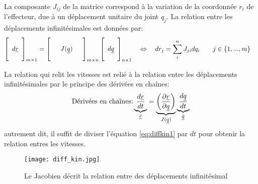 La composante $J_{ij}$ de la matrice correspond à la variation de la coordonnée $r_i$ de l'effecteur, due à un déplacement unitaire du joint $q_j$. La relation entre les déplacements infinitésimales est données par:
\begin{align}
\left[ \begin{array}{c}  \\ d\underline{r} \\ \\
\end{array} \right]_{m \times 1}
&= 
\left[ \begin{array}{c c c} 
&&\\
& J(\underline{q}) &\\
&&
\end{array} \right]_{m \times n}
\left[ \begin{array}{c} 
\\ d\underline{q} \\ \\
\end{array} \right]_{n \times 1}
\quad \Leftrightarrow \quad
dr_j
= \sum_i^n{
J_{ji} 
dq_i
}
\quad \quad j \in \left\{ 1 , ... , m \right\}
\label{eq:diffkin1}
\end{align}


La relation qui relit les vitesses est relié à la relation entre les déplacements infinitésimales par le principe des dérivées en chaînes:
\begin{equation}
\text{Dérivées en chaînes:} 
\underbrace{
\frac{d \underline{r}}{dt}
}_{\underline{\dot{r}}}
= 
\underbrace{
\left( \frac{\partial \underline{r}}{\partial \underline{q}} \right)
}_{J(\underline{q})}
\underbrace{
\frac{d \underline{q}}{dt}
}_{\underline{\dot{q}}}
\end{equation}
autrement dit, il suffit de diviser l'équation \eqref{eq:diffkin1} par $dt$ pour obtenir la relation entres les vitesses. 

\begin{figure}[H]
	\centering
		\texttt{[image: diff\_kin.jpg]}
	\caption{Le Jacobien décrit la relation entre des déplacements infinitésimal}
	\label{fig:diff_kin_variation}
\end{figure}


